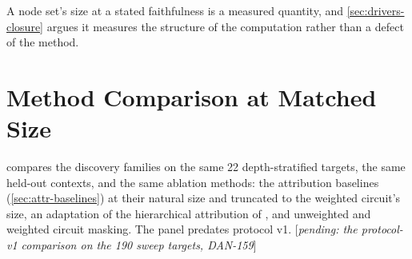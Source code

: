 \documentclass[10pt]{article}
\newcommand{\pending}[1]{\textcolor{red!70!black}{[\textit{pending: #1}]}}
\begin{document}
A node set's size at a stated faithfulness is a measured quantity, and \cref{sec:drivers-closure} argues it measures the structure of the computation rather than a defect of the method.

\section{Method Comparison at Matched Size}
\label{app:method-comparison}
\label{sec:method-comparison}
 compares the discovery families on the same 22 depth-stratified targets, the same held-out contexts, and the same ablation methods: the attribution baselines (\cref{sec:attr-baselines}) at their natural size and truncated to the weighted circuit's size, an adaptation of the hierarchical attribution of \citet{ge2024automatically}, and unweighted and weighted circuit masking.
The panel predates protocol v1. \pending{the protocol-v1 comparison on the 190 sweep targets, DAN-159}
\end{document}
